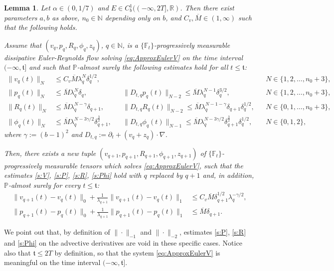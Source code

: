 \documentclass[10pt,a4paper]{amsart}
\numberwithin{equation}{section}
\numberwithin{corollario}{section}
\newtheorem{lemma}{Lemma}
\numberwithin{lemma}{section}
\numberwithin{prop}{section}
\theoremstyle{definition}
\theoremstyle{remark}
\newcommand{\N}{\mathbb{N}}
\newcommand{\R}{\mathbb{R}}
\newcommand{\qq}{_{q+1}}
\newcommand{\oM}{\overline{M}}
\begin{document}
\begin{lemma}
\label{IterLemma}
Let $\alpha \in (0,1/7)$ and $E\in C^1_b((-\infty,2T],\R)$. Then there exist parameters $a,b$ as above, $n_0\in \N$ depending only on $b$, and $C_v, \oM \in (1,\infty)$ such that the following holds.

    Assume that $(v_q,p_q,R_q,\phi_q,z_q)$, $q \in \N$, is a $\{\mathbb{F}_t\}$-progressively measurable dissipative Euler-Reynolds flow solving \eqref{eq:ApproxEulerV} on the time interval $(-\infty,\mathfrak{t}]$ and such that $\mathbb{P}$-almost surely the following estimates hold for all $t \leq \mathfrak{t}$:
   \begin{align}
        \label{s:V} \|v_q(t)\|_{N}
        &\le C_v \oM\lambda_q^N\delta_q^{1/2}, 
        &&
        && 
        N \in \{1,2,\dots,n_0+3\},
        \\
        \label{s:P} \|p_q(t)\|_{N}&\le \overline{M} \lambda_q^N\delta_q,
        &&
        \|D_{t,q}p_q(t)\|_{N-2}\le \overline{M}\lambda_q^{N-1}\delta_q^{3/2}, 
        &&  
        N \in \{1,2,\dots,n_0+3\},
        \\
        \label{s:R} \|R_q(t)\|_{N}&\le \oM\lambda_q^{N-\gamma}\delta_{q+1},
        &&
        \|D_{t,q}R_q(t)\|_{N-2}\le \oM \lambda_q^{N-1-\gamma}\delta\qq\delta_q^{1/2}, 
        &&  
        N \in \{0,1,\dots,n_0+3\},
        \\
        \label{s:Phi} \|\phi_q(t)\|_{N}
        &\le \oM\lambda_q^{N-3\gamma/2}\delta_{q+1}^{\frac{3}{2}},
        &&
        \|D_{t,q}\phi_q(t)\|_{N-1}\le \oM \lambda_q^{N-3\gamma/2}\delta_{q+1}^{\frac{3}{2}}\delta_q^{1/2}, 
        &&   
        N \in \{0,1,2\},
   \end{align}
where $\gamma:=(b-1)^2$ and $D_{t,q}:=\partial_t+(v_q+z_q)\cdot \nabla$.

   Then, there exists a new tuple $(v\qq,p\qq,R\qq,\phi\qq,z\qq)$ of $\{\mathbb{F}_t\}$-progressively measurable tensors which solves \eqref{eq:ApproxEulerV}, such that the estimates \eqref{s:V}, \eqref{s:P}, \eqref{s:R}, \eqref{s:Phi} hold with $q$ replaced by $q+1$ and, in addition, $\mathbb{P}$-almost surely for every $t \leq \mathfrak{t}$:
   \begin{align}
   \label{s:distance_v}
       \|v_{q+1}(t)-v_q(t)\|_{0}+ \frac{1}{\lambda\qq}\|v_{q+1}(t)-v_q(t)\|_{1}
       &\le 
       C_v\oM\delta_{q+1}^{1/2}\lambda_q^{-\gamma/2},
   \\ \label{s:distance_p}
       \|p\qq(t)-p_q(t)\|_0+\frac{1}{\lambda\qq}\|p\qq(t)-p_q(t)\|_1
       &\le 
       \overline{M}\delta\qq.
   \end{align}
\end{lemma}
We point out that, by definition of $\| \cdot \|_{-1}$ and $\|\cdot\|_{-2}$, estimates \eqref{s:P}, \eqref{s:R} and \eqref{s:Phi} on the advective derivatives are void in these specific cases. Notice also that $\mathfrak{t} \leq 2T$ by definition, so that the system \eqref{eq:ApproxEulerV} is meaningful on the time interval $(-\infty,\mathfrak{t}]$. 
\end{document}
